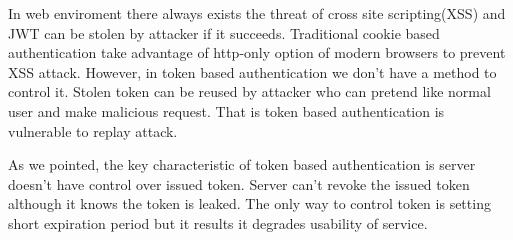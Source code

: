 \documentclass[journal,article,submit,moreauthors,pdftex,10pt,a4paper]{mdpi}
\begin{document}
In web enviroment there always exists the threat of cross site scripting(XSS) and JWT can be stolen by attacker if it succeeds. Traditional cookie based authentication take advantage of http-only option of modern browsers to prevent XSS attack. However, in token based authentication we don't have a method to control it. Stolen token can be reused by attacker who can pretend like normal user and make malicious request. That is token based authentication is vulnerable to replay attack.

As we pointed, the key characteristic of token based authentication is server doesn't have control over issued token. Server can't revoke the issued token although it knows the token is leaked. The only way to control token is setting short expiration period but it results it degrades usability of service. 







\end{document}
